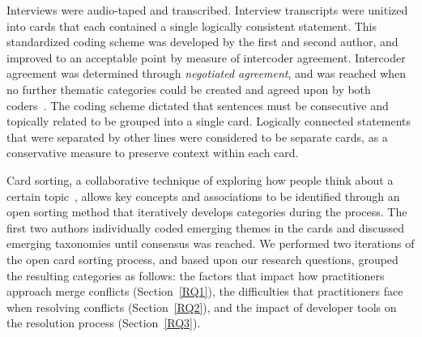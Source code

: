  Interviews were audio-taped and transcribed. Interview transcripts were unitized~\cite{unitization} into cards that each contained a single logically consistent statement. This standardized coding scheme was developed by the first and second author, and improved to an acceptable point by measure of intercoder agreement.
Intercoder agreement was determined through \textit{negotiated agreement}, and was reached when no further thematic categories could be created and agreed upon by both coders~\cite{garrison2006revisiting}\cite{ritchie2013qualitative}.
The coding scheme dictated that sentences must be consecutive and topically related to be grouped into a single card. Logically connected statements that were separated by other lines were considered to be separate cards, as a conservative measure to preserve context within each card.

Card sorting, a collaborative technique of exploring how people think about a certain topic~\cite{spencer2009card}\cite{card_sort}, allows key concepts and associations to be identified through an open sorting method that iteratively develops categories during the process.
The first two authors individually coded emerging themes in the cards and discussed emerging taxonomies until consensus was reached.
We performed two iterations of the open card sorting process, and based upon our research questions, grouped the resulting categories as follows: the factors that impact how practitioners approach merge conflicts (Section~\ref{RQ1}), the difficulties that practitioners face when resolving conflicts (Section~\ref{RQ2}), and the impact of developer tools on the resolution process (Section~\ref{RQ3}).


